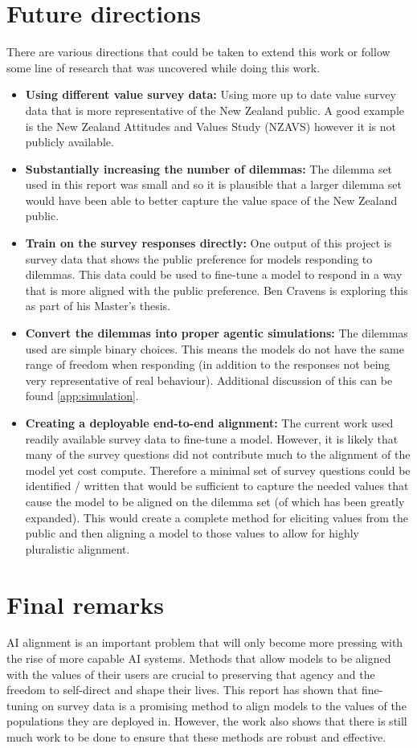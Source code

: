 \section{Future directions}

There are various directions that could be taken to extend this work or follow some line of research that was uncovered while doing this work.

\begin{itemize}
    \item \textbf{Using different value survey data:} Using more up to date value survey data that is more representative of the New Zealand public. A good example is the New Zealand Attitudes and Values Study (NZAVS) however it is not publicly available.
    \item \textbf{Substantially increasing the number of dilemmas:} The dilemma set used in this report was small and so it is plausible that a larger dilemma set would have been able to better capture the value space of the New Zealand public.
    \item \textbf{Train on the survey responses directly:} One output of this project is survey data that shows the public preference for models responding to dilemmas. This data could be used to fine-tune a model to respond in a way that is more aligned with the public preference. Ben Cravens is exploring this as part of his Master's thesis.
    \item \textbf{Convert the dilemmas into proper agentic simulations:} The dilemmas used are simple binary choices. This means the models do not have the same range of freedom when responding (in addition to the responses not being very representative of real behaviour). Additional discussion of this can be found \ref{app:simulation}.
    \item \textbf{Creating a deployable end-to-end alignment:} The current work used readily available survey data to fine-tune a model. However, it is likely that many of the survey questions did not contribute much to the alignment of the model yet cost compute. Therefore a minimal set of survey questions could be identified / written that would be sufficient to capture the needed values that cause the model to be aligned on the dilemma set (of which has been greatly expanded). This would create a complete method for eliciting values from the public and then aligning a model to those values to allow for highly pluralistic alignment.
\end{itemize}

\section{Final remarks}

AI alignment is an important problem that will only become more pressing with the rise of more capable AI systems. Methods that allow models to be aligned with the values of their users are crucial to preserving that agency and the freedom to self-direct and shape their lives. This report has shown that fine-tuning on survey data is a promising method to align models to the values of the populations they are deployed in. However, the work also shows that there is still much work to be done to ensure that these methods are robust and effective.